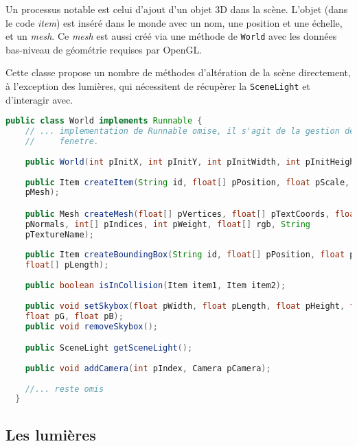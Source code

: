 \documentclass{report}
\begin{document}
Un processus notable est celui d'ajout d'un objet 3D dans la scène.
L'objet (dans le code \emph{item}) est inséré dans le monde avec un nom, une
position et une échelle, et un \emph{mesh}.
Ce \emph{mesh} est aussi créé via une méthode de \lstinline|World| avec les
données bas-niveau de géométrie requises par OpenGL.

Cette classe propose un nombre de méthodes d'altération de la scène directement,
à l'exception des lumières, qui nécessitent de récupèrer la
\lstinline|SceneLight| et d'interagir avec.

\begin{lstlisting}[caption=Interface incomplète de la classe World, label={lst:worldclass},language=Java]
  public class World implements Runnable {
    // ... implementation de Runnable omise, il s'agit de la gestion de la
    //     fenetre.
    
    public World(int pInitX, int pInitY, int pInitWidth, int pInitHeight);
    
    public Item createItem(String id, float[] pPosition, float pScale, Mesh
    pMesh);

    public Mesh createMesh(float[] pVertices, float[] pTextCoords, float[]
    pNormals, int[] pIndices, int pWeight, float[] rgb, String
    pTextureName);
         
    public Item createBoundingBox(String id, float[] pPosition, float pScale,
    float[] pLength);
    
    public boolean isInCollision(Item item1, Item item2);
    
    public void setSkybox(float pWidth, float pLength, float pHeight, float pR,
    float pG, float pB);
    public void removeSkybox();

    public SceneLight getSceneLight();
   
    public void addCamera(int pIndex, Camera pCamera);
 
    //... reste omis
  }
\end{lstlisting}

\subsection{Les lumières}
\end{document}
